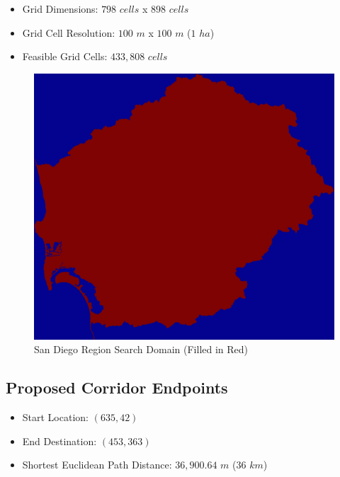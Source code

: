     \begin{itemize}
      \setlength{\itemsep}{0cm}
      \setlength{\parskip}{0cm}
        \item Grid Dimensions: $798$ $cells$ x $898$ $cells$
        \item Grid Cell Resolution: $100$ $m$ x $100$ $m$ ($1$ $ha$)
        \item Feasible Grid Cells: $433,808$ $cells$
    \end{itemize}
    
        \begin{figure}[!h]
            \begin{center}
            \includegraphics[width=5.5in]{figures/SanDiego_SearchDomain.png}   
            \caption{San Diego Region Search Domain (Filled in Red)}
            \label{fig:SDdomain}
            \end{center}
        \end{figure}

    \subsection{Proposed Corridor Endpoints}
    
    \begin{itemize}
      \setlength{\itemsep}{0cm}
      \setlength{\parskip}{0cm}
        \item Start Location: $(635,42)$
        \item End Destination: $(453,363)$    
        \item Shortest Euclidean Path Distance: $36,900.64$ $m$ ($36$ $km$)
    \end{itemize}
    
